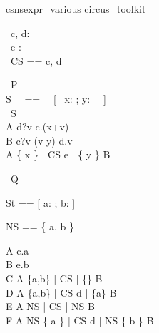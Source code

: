 \begin{zsection}
   \SECTION csnsexpr\_various \parents circus\_toolkit
\end{zsection}

\begin{circus}
   \circchannel\ c, d: \nat \\
   \circchannel\ e : \nat \cross \nat \\
   \circchannelset\ CS == \lchanset c, d \rchanset
\end{circus}

\begin{circus}
    \circprocess\ P \circdef \circbegin \\
    	 S ~~==~~ [~ x: \nat; y: \power~\nat ~] \\
	 \circstate\  S \\
        A \circdef d?v \then c.(x+v) \then \Skip \\
        B \circdef c?v \prefixcolon (v \in y) \then d.v \then \Skip \\

        \circspot A \lpar \{ x \} | CS \cup \lchanset e \rchanset | \{ y \} \rpar B \\
   \circend
\end{circus}

\begin{circus}
   \circprocess\ Q \circdef \circbegin
\end{circus}

\begin{circusaction}
    \circstate St == [ a: \nat; b: \nat \cross \nat ]
\end{circusaction}

\begin{circusaction}
   \circnameset NS == \{ a, b \}
\end{circusaction}

\begin{circusaction}
    A \circdef c.a \then \Skip
    \\
    B \circdef e.b \then \Skip
    \\
    C \circdef A \lpar \{a,b\} | CS | \{\} \rpar B
    \\
    D \circdef A \lpar \{a,b\} | CS \setminus \lchanset d \rchanset | \{a\} \rpar B
    \\
    E \circdef A \lpar NS | CS | NS \rpar B
    \\
    F \circdef A \lpar NS \setminus \{ a \} | CS \setminus \lchanset d \rchanset | NS \setminus \{ b \} \rpar B
\end{circusaction}


